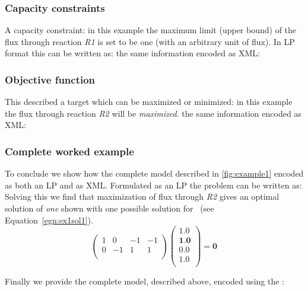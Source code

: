\subsubsection{Capacity constraints}
\label{examples1:fluxbound}
A capacity constraint: in this example the maximum limit (upper bound) of the flux through reaction \textit{R1} is set to be one (with an arbitrary unit of flux). In LP format this can be written as:
%
%
the same information encoded as XML:
%

\subsubsection{Objective function}
\label{examples1:objfunc}
This described a target which can be maximized or minimized: in this example the flux through reaction \textit{R2} will be \textit{maximized}.
%
%
the same information encoded as XML:
%

\subsubsection{Complete worked example}
\label{examples1:complete}
To conclude we show how the complete model described in \ref{fig:example1} encoded as both an LP and as XML. Formulated as an LP the problem can be written as:
%
%
Solving this we find that maximization of flux through \textit{R2}
gives an optimal solution of \textit{one} shown with one possible solution
for \Jvec\ (see Equation~\ref{egn:ex1sol1}).
\begin{equation}\label{egn:ex1sol1}
  \left(
    \begin{array}{cccc}
        1 &  0 & -1 & -1 \\
        0 & -1 &  1 &  1 \\
    \end{array}
  \right)
  \left(
    \begin{array}{c}
        1.0 \\
        \textbf{1.0} \\
        0.0 \\
        1.0 \\
    \end{array}
  \right)
  = \textbf{0}
\end{equation}

Finally we provide the complete model, described above, encoded using the \FBCPackage:
%

